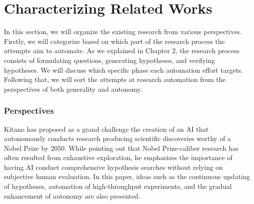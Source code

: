 
\section{Characterizing Related Works}
In this section, we will organize the existing research from various perspectives. Firstly, we will categorize based on which part of the research process the attempts aim to automate. As we explained in Chapter 2, the research process consists of formulating questions, generating hypotheses, and verifying hypotheses. We will discuss which specific phase each automation effort targets. Following that, we will sort the attempts at research automation from the perspectives of both generality and autonomy.

\subsubsection{Perspectives}

Kitano \cite{kitano2021nobel} has proposed as a grand challenge the creation of an AI that autonomously conducts research producing scientific discoveries worthy of a Nobel Prize by 2050. While pointing out that Nobel Prize-caliber research has often resulted from exhaustive exploration, he emphasizes the importance of having AI conduct comprehensive hypothesis searches without relying on subjective human evaluation. In this paper, ideas such as the continuous updating of hypotheses, automation of high-throughput experiments, and the gradual enhancement of autonomy are also presented.




